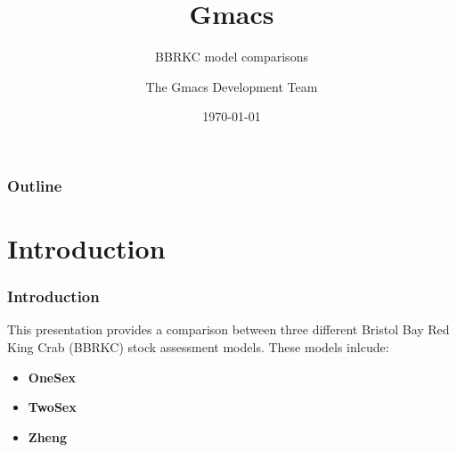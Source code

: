 \documentclass{beamer}
\title{Gmacs}
\subtitle{BBRKC model comparisons}
\author{The Gmacs Development Team}
\date{\today}
\begin{document}

\begin{frame}
\titlepage
\end{frame}


\begin{frame}
\frametitle{Outline}
\tableofcontents
\end{frame}


\section{Introduction}


\begin{frame}
\frametitle{Introduction}
This presentation provides a comparison between three different Bristol Bay Red
King Crab (BBRKC) stock assessment models. These models inlcude:
\begin{itemize}
\item {\bf OneSex}
\item {\bf TwoSex}
\item {\bf Zheng}~\citep{zheng_bristol_2015}
\end{itemize}
\end{frame}

\end{document}
